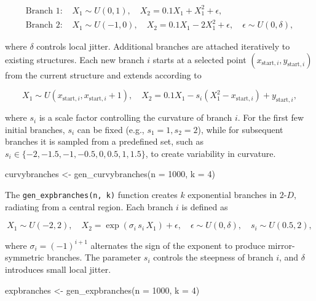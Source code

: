 \documentclass[
  11pt,
  a4paper,
]{report}
\newenvironment{Shaded}{\begin{snugshade}}{\end{snugshade}}
\newcommand{\AttributeTok}[1]{\textcolor[rgb]{0.40,0.45,0.13}{#1}}
\newcommand{\DecValTok}[1]{\textcolor[rgb]{0.68,0.00,0.00}{#1}}
\newcommand{\FunctionTok}[1]{\textcolor[rgb]{0.28,0.35,0.67}{#1}}
\newcommand{\NormalTok}[1]{\textcolor[rgb]{0.00,0.23,0.31}{#1}}
\newcommand{\OtherTok}[1]{\textcolor[rgb]{0.00,0.23,0.31}{#1}}
\newcommand\gD{$2\text{-}D$}
\begin{document}
\[
\begin{aligned}
\text{Branch 1: } & X_1 \sim U(0,1), \quad X_2 = 0.1 X_1 + X_1^2 + \epsilon, \\
\text{Branch 2: } & X_1 \sim U(-1,0), \quad X_2 = 0.1 X_1 - 2 X_1^2 + \epsilon, \quad \epsilon \sim U(0, \delta),
\end{aligned}
\]

where \(\delta\) controls local jitter. Additional branches are attached
iteratively to existing structures. Each new branch \(i\) starts at a
selected point \((x_{\text{start},i}, y_{\text{start},i})\) from the
current structure and extends according to

\[
X_1 \sim U(x_{\text{start},i}, x_{\text{start},i}+1), \quad X_2 = 0.1 X_1 - s_i (X_1^2 - x_{\text{start},i}) + y_{\text{start},i},
\]

where \(s_i\) is a scale factor controlling the curvature of branch
\(i\). For the first few initial branches, \(s_i\) can be fixed (e.g.,
\(s_1 = 1, s_2 = 2\)), while for subsequent branches it is sampled from
a predefined set, such as
\(s_i \in \{-2, -1.5, -1, -0.5, 0, 0.5, 1, 1.5\}\), to create
variability in curvature.

\begin{Shaded}
\begin{Highlighting}[]
\NormalTok{curvybranches }\OtherTok{\textless{}{-}} \FunctionTok{gen\_curvybranches}\NormalTok{(}\AttributeTok{n =} \DecValTok{1000}\NormalTok{, }\AttributeTok{k =} \DecValTok{4}\NormalTok{)}
\end{Highlighting}
\end{Shaded}

The \texttt{gen\_expbranches(n,\ k)} function creates \(k\) exponential
branches in \gD{}, radiating from a central region. Each branch \(i\) is
defined as

\[
X_1 \sim U(-2,2), \quad X_2 = \exp(\sigma_i \, s_i \, X_1) + \epsilon, \quad \epsilon \sim U(0, \delta), \quad s_i \sim U(0.5,2),
\]

where \(\sigma_i = (-1)^{i+1}\) alternates the sign of the exponent to
produce mirror-symmetric branches. The parameter \(s_i\) controls the
steepness of branch \(i\), and \(\delta\) introduces small local jitter.

\begin{Shaded}
\begin{Highlighting}[]
\NormalTok{expbranches }\OtherTok{\textless{}{-}} \FunctionTok{gen\_expbranches}\NormalTok{(}\AttributeTok{n =} \DecValTok{1000}\NormalTok{, }\AttributeTok{k =} \DecValTok{4}\NormalTok{)}
\end{Highlighting}
\end{Shaded}
\end{document}
